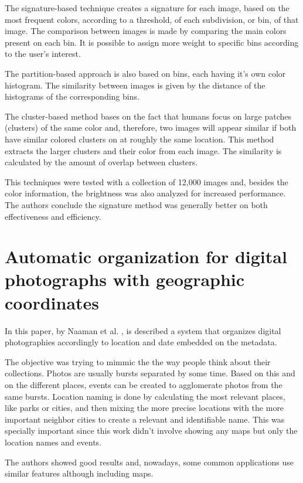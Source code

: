The signature-based technique creates a signature for each image, based on the most frequent colors, according to a threshold, of each subdivision, or bin, of that image. The comparison between images is made by comparing the main colors present on each bin. It is possible to assign more weight to specific bins according to the user's interest.

The partition-based approach is also based on bins, each having it's own color histogram. The similarity between images is given by the distance of the histograms of the corresponding bins.

The cluster-based method bases on the fact that humans focus on large patches (clusters) of the same color and, therefore, two images will appear similar if both have similar colored clusters on at roughly the same location. This method extracts the larger clusters and their color from each image. The similarity is calculated by the amount of overlap between clusters.

This techniques were tested with a collection of 12,000 images and, besides the color information, the brightness was also analyzed for increased performance. The authors conclude the signature method was generally better on both effectiveness and efficiency.


\section{Automatic organization for digital photographs with geographic coordinates} %
\label{sub:Naaman}

In this paper, by Naaman et al. \cite{Naaman:2004p1802}, is described a system that organizes digital photographies accordingly to location and date embedded on the metadata.

The objective was trying to mimmic the the way people think about their collections. Photos are usually bursts separated by some time. Based on this and on the different places, events can be created to agglomerate photos from the same bursts. Location naming is done by calculating the most relevant places, like parks or cities, and then mixing the more precise locations with the more important neighbor cities to create a relevant and identifiable name. This was specially important since this work didn't involve showing any maps but only the location names and events.

The authors showed good results and, nowadays, some common applications use similar features although including maps.

